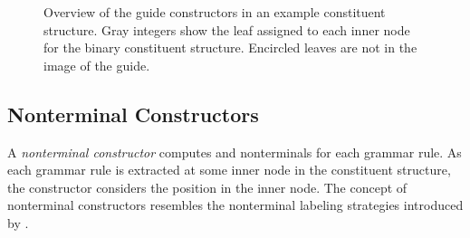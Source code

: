 \documentclass[../../document.tex]{subfiles}
\begin{document}
    \begin{figure}
        \begin{minipage}{.27\textwidth}
            \resizebox{\textwidth}{!}{}
        \end{minipage}\hfill
        \begin{minipage}{.27\textwidth}
            \resizebox{\textwidth}{!}{}
        \end{minipage}\hfill
        \begin{minipage}{.27\textwidth}
            \resizebox{\textwidth}{!}{}
        \end{minipage}

        \vspace{.5cm}

        \begin{minipage}[b]{.27\textwidth}
            \resizebox{\textwidth}{!}{}
        \end{minipage}\hfill
        \begin{minipage}[b]{.27\textwidth}
            \resizebox{\textwidth}{!}{}
        \end{minipage}\hfill
        \begin{minipage}[b]{.27\textwidth}
            \resizebox{\textwidth}{!}{}
        \end{minipage}

        \caption{\label{fig:guides}
            Overview of the guide constructors in an example constituent structure.
            Gray integers show the leaf assigned to each inner node for the binary constituent structure.
            Encircled leaves are not in the image of the guide.}
    \end{figure}

    \subsection{Nonterminal Constructors}\label{sec:ntconstructors}
    A \emph{nonterminal constructor} computes  and  nonterminals for each grammar rule.
    As each grammar rule is extracted at some inner node in the constituent structure, the constructor considers the position in the inner node.
    The concept of nonterminal constructors resembles the nonterminal labeling strategies introduced by \citet[Section~6.2]{Geb20}.
\end{document}
